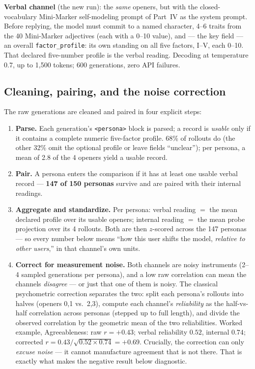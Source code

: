 \documentclass[11pt]{article}
\begin{document}
\textbf{Verbal channel} (the new run): the \emph{same} openers, but with the
closed-vocabulary Mini-Marker self-modeling prompt of Part~IV as the system
prompt. Before replying, the model must commit to a named character, 4--6
traits from the 40 Mini-Marker adjectives (each with a 0--10 value), and ---
the key field --- an overall \texttt{factor\_profile}: its own standing on
all five factors, I--V, each 0--10. That declared five-number profile is the
verbal reading. Decoding at temperature 0.7, up to 1{,}500 tokens; 600
generations, zero API failures.

\subsection{Cleaning, pairing, and the noise correction}

The raw generations are cleaned and paired in four explicit steps:

\begin{enumerate}
  \item \textbf{Parse.} Each generation's \texttt{<persona>} block is parsed;
        a record is \emph{usable} only if it contains a complete numeric
        five-factor profile. 68\% of rollouts do (the other 32\% omit the
        optional profile or leave fields ``unclear''); per persona, a mean of
        2.8 of the 4 openers yield a usable record.
  \item \textbf{Pair.} A persona enters the comparison if it has at least one
        usable verbal record --- \textbf{147 of 150 personas} survive and are
        paired with their internal readings.
  \item \textbf{Aggregate and standardize.} Per persona: verbal reading $=$
        the mean declared profile over its usable openers; internal reading
        $=$ the mean probe projection over its 4 rollouts. Both are then
        $z$-scored across the 147 personas --- so every number below means
        ``how this user shifts the model, \emph{relative to other users},''
        in that channel's own units.
  \item \textbf{Correct for measurement noise.} Both channels are noisy
        instruments (2--4 sampled generations per persona), and a low raw
        correlation can mean the channels \emph{disagree} --- or just that one
        of them is noisy. The classical psychometric correction separates the
        two: split each persona's rollouts into halves (openers 0,1 vs.\
        2,3), compute each channel's \emph{reliability} as the half-vs-half
        correlation across personas (stepped up to full length), and divide
        the observed correlation by the geometric mean of the two
        reliabilities. Worked example, Agreeableness: raw $r = +0.43$;
        verbal reliability $0.52$, internal $0.74$; corrected
        $r = 0.43 / \sqrt{0.52 \times 0.74} = +0.69$. Crucially, the
        correction can only \emph{excuse noise} --- it cannot manufacture
        agreement that is not there. That is exactly what makes the negative
        result below diagnostic.
\end{enumerate}
\end{document}

